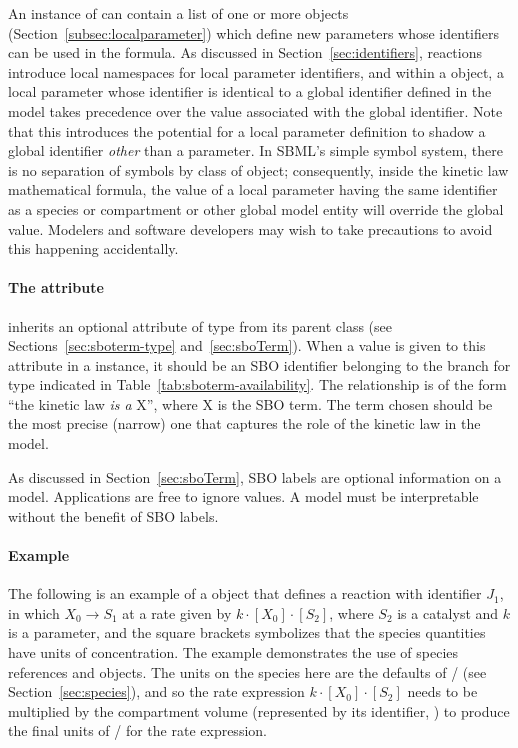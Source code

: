 An instance of \KineticLaw can contain a list of
one or more \LocalParameter objects (Section~\ref{subsec:localparameter})
which define new parameters whose identifiers can be used in the
 formula.  As discussed in
Section~\ref{sec:identifiers}, reactions introduce local
namespaces for local parameter identifiers, and within a
\KineticLaw object, a local parameter whose identifier is
identical to a global identifier defined in the model takes
precedence over the value associated with
the global identifier.  Note that this introduces the potential
for a local parameter definition to shadow a global identifier
\emph{other} than a parameter.  In SBML's simple symbol system, 
there is no separation of symbols by class of object;
consequently,  inside the kinetic law mathematical
formula, the value of a local parameter having the same
identifier as a species or compartment or other global model
entity will override the global value.  Modelers and software
developers may wish to take precautions to avoid this happening
accidentally.


\paragraph{The  attribute}

\KineticLaw  inherits an optional 
attribute of type  from its parent
class \SBase (see Sections~\ref{sec:sboterm-type}
and~\ref{sec:sboTerm}).  When a value is given to this
attribute in a  \KineticLaw instance, it should be an
SBO identifier belonging to the branch for type  \KineticLaw
indicated in Table~\ref{tab:sboterm-availability}.  The relationship is
of the form ``the kinetic law \emph{is a} X'', where X is
the SBO term.  The term chosen should be the most precise (narrow)
one that captures the role of the kinetic law in the model.

As discussed in Section~\ref{sec:sboTerm}, SBO labels are optional
information on a model.  Applications are free to ignore
 values.  A model must be interpretable without the
benefit of SBO labels.

\paragraph{Example}

The following is an example of a \Reaction object that defines
a reaction with identifier $J_1$, in which $X_0 \rightarrow S_1$
at a rate given by $k \cdot [X_0] \cdot [S_2]$, where $S_2$ is a catalyst
and $k$ is a parameter, and the square brackets symbolizes that
the species quantities have units of concentration.  The example
demonstrates the use of species references and \KineticLaw
objects.  The units on the species here are the defaults of
/ (see
Section~\ref{sec:species}), and so the rate expression $k \cdot [X_0]
 \cdot [S_2]$ needs to be multiplied by the compartment volume
(represented by its identifier, ) to produce the final
units of / for the rate
expression.

